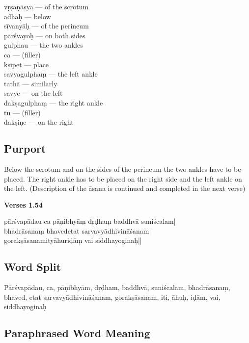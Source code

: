 \begin{multicols}{2}
vṛṣaṇāsya ---  of the scrotum \\
adhaḥ ---  below  \\
sīvanyāḥ --- of the perineum   \\
pārśvayoḥ ---  on both sides  \\
gulphau ---  the two ankles  \\
ca ---   (filler) \\
kṣipet --- place  \\
savyagulphaṃ --- the left ankle  \\
tathā ---  similarly \\
savye ---  on the left  \\
dakṣagulphaṃ ---  the right ankle  \\
tu ---  (filler) \\
dakṣiṇe --- on the right 
\end{multicols}

\subsection*{Purport}

Below the scrotum and on the sides of the perineum the two ankles have to be placed. The right ankle has to be placed on the right side and the left ankle on the left. (Description of the āsana is continued and completed in the next verse)

\newpage
\noindent \textbf{Verses 1.54}

\begin{shloka}
pārśvapādau ca pāṇibhyāṃ dṛḍhaṃ baddhvā suniścalam|\\
bhadrāsanaṃ bhavedetat sarvavyādhivināśanam|\\
gorakṣāsanamityāhuriḍāṃ vai siddhayoginaḥ||
\end{shloka}

\subsection*{Word Split}

Pārśvapādau, ca, pāṇibhyām, dṛḍham, baddhvā, suniścalam, bhadrā\-sanaṃ, bhaved, etat sarvavyādhivināśanam, gorakṣāsanam, iti, āhuḥ, iḍām, vai, siddhayoginaḥ
\vspace{-10pt}

\subsection*{Paraphrased Word Meaning}
\vspace{-10pt}

